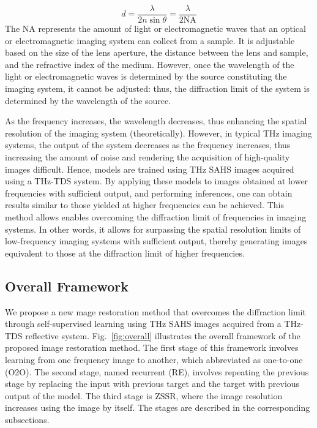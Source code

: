 \begin{equation}
\label{eq:resolution}
{\displaystyle d={\frac {\lambda }{2n\sin \theta }}={\frac {\lambda }{2\mathrm {NA} }}}
\end{equation}
The NA represents the amount of light or electromagnetic waves that an optical or electromagnetic imaging system can collect from a sample. It is adjustable based on the size of the lens aperture, the distance between the lens and sample, and the refractive index of the medium. However, once the wavelength of the light or electromagnetic waves is determined by the source constituting the imaging system, it cannot be adjusted: thus, the diffraction limit of the system is determined by the wavelength of the source.

As the frequency increases, the wavelength decreases, thus enhancing the spatial resolution of the imaging system (theoretically). However, in typical THz imaging systems, the output of the system decreases as the frequency increases, thus increasing the amount of noise and rendering the acquisition of  high-quality images difficult. Hence, models are trained using THz SAHS images acquired using a THz-TDS system. By applying these models to images obtained at lower frequencies with sufficient output, and performing inferences, one can obtain results similar to those yielded at higher frequencies can be achieved. This method allows enables overcoming the diffraction limit of frequencies in imaging systems. In other words, it allows for surpassing the spatial resolution limits of low-frequency imaging systems with sufficient output, thereby generating images equivalent to those at the diffraction limit of higher frequencies.


\subsection{Overall Framework}
We propose a new mage restoration method that overcomes the diffraction limit through self-supervised learning using THz SAHS images acquired from a THz-TDS reflective system. Fig.~\ref{fig:overall} illustrates the overall framework of the proposed image restoration method. The first stage of this framework involves learning from one frequency image to another, which abbreviated as one-to-one (O2O). The second stage, named recurrent (RE), involves repeating the previous stage by replacing the input with previous target and the target with previous output of the model. The third stage is ZSSR, where the image resolution increases using the image by itself. The stages are described in the corresponding subsections.

